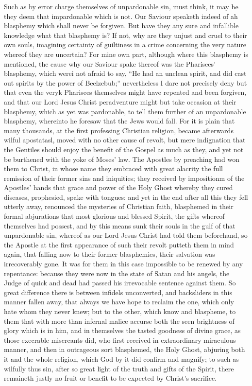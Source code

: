 Such as by error charge themselves of unpardonable sin, must think, it may be they deem that impardonable which is not. Our Saviour speaketh indeed of ah blasphemy which shall never be forgiven. But have they any sure and infallible knowledge what that blasphemy is? If not, why are they unjust and cruel to their own souls, imagining certainty of guiltiness in a crime concerning the very nature whereof they are uncertain? For mine own part, although where this blasphemy is mentioned, the cause why our Saviour spake thereof was the Pharisees’ blasphemy, which werei not afraid to say, “He had an unclean spirit, and did cast out spirits by the power of Beelzebub;” nevertheless I dare not precisely deny but that even the veryk Pharisees themselves might have repented and been forgiven, and that our Lord Jesus Christ peradventure might but take occasion at their blasphemy, which as yet was pardonable, to tell them further of an unpardonable blasphemy, whereinto he foresaw that the Jews would fall. For it is plain that many thousands, at the first professing Christian religion, became afterwards wilful apostatasl, moved with no other cause of revolt, but mere indignation that the Gentiles should enjoy the benefit of the Gospel as much as they, and yet not be burthened with the yoke of Moses’ law. The Apostles by preaching had won them to Christ, in whose name they embraced with great alacrity the full remission of their former sins and iniquities; they received by impositionm of the Apostles’ hands that grace and power of the Holy Ghost whereby they cured diseases, prophesied, spake with tongues: and yet in the end after all this they fell utterly away, renounced the mysteries of Christian faith, blasphemed in their formal abjurations that most glorious and blessed Spirit, the gifts whereof themselves had possest, and by this means sunk their souls in the gulf of that unpardonable sin, whereof as our Lord Jesus  Christ had told them beforehand, so the Apostle at the first appearance of such their revolt putteth them in mind again, that falling now to their former blasphemies, their salvation was irrecoverably gone. It was for them in this case impossible to be renewed by any repentance: because they were now in the state of Satan and his angels, the Judge of quick and dead had passed his irrevocable sentence against them. So great difference there is between infidels unconverted, and backsliders in this manner fallen away, that always we have hope to reclaim the one, which only hate whom they never knew; but to the other, which know and blaspheme, to them that with more than infernal malice accurse both the seen brightness of glory which is in him, and in themselves the tasted goodness of divine grace, as those execrable miscreants did, who first received in extraordinary miraculous manner, and then in outrageous sort blasphemed, the Holy Ghost, abjuring both it and the whole religion, which God by it did confirm and magnify; to such as wilfully thus sin, after so great light of the truth and gifts of the Spirit, there remaineth justly no fruit or benefit to be expected by Christ’s sacrifice.

